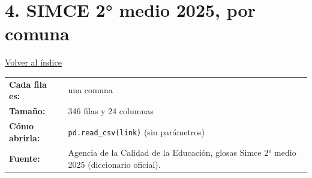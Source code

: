 \documentclass[10.5pt]{article}
\begin{document}
\section*{4. SIMCE 2° medio 2025, por comuna}
\vspace{-6pt}\hfill{\small\hyperlink{indice}{\textcolor{azuloscuro}{\underline{Volver al índice}}}}\par\vspace{2pt}
\begin{tabularx}{\linewidth}{@{}l X@{}}\textbf{Cada fila es:} & una comuna \\\textbf{Tamaño:} & 346 filas y 24 columnas \\\textbf{Cómo abrirla:} & \texttt{pd.read\_\allowbreak{}csv(link)} (sin parámetros) \\\textbf{Fuente:} & Agencia de la Calidad de la Educación, glosas Simce 2° medio 2025 (diccionario oficial). \\\end{tabularx}
\vspace{6pt}
\end{document}
